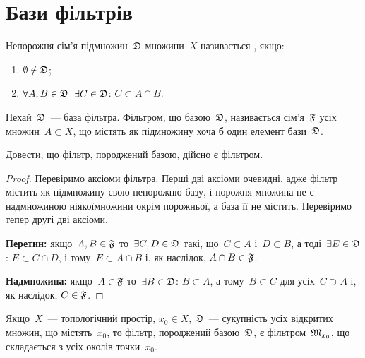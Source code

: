 \section{Бази фільтрів}

\begin{definition}
    Непорожня сім'я підмножин~$\frak D$ множини~$X$ називається , якщо:
    \begin{enumerate}
        \item $\emptyset \notin \frak D$;
        \item $\forall A, B \in \frak D$~$\exists C \in \frak D$: $C \subset A \cap B$.
    \end{enumerate}
\end{definition}

\begin{definition}
    Нехай~$\frak D$~--- база фільтра. Фільтром, що  базою~$\frak D$, називається сім'я~$\frak F$ усіх множин~$A \subset X$, що містять як підмножину хоча б один елемент бази~$\frak D$.
\end{definition}

\begin{exercise}
    Довести, що фільтр, породжений базою, дійсно є фільтром.
\end{exercise}
\begin{proof}
    Перевіримо аксіоми фільтра. Перші дві аксіоми очевидні, адже фільтр містить як підмножину свою непорожню базу, і порожня множина не є надмножиною ніякоїмножини окрім порожньої, а база її не містить. Перевіримо тепер другі дві аксіоми. 
    
    \textbf{Перетин:} якщо~$A, B \in \frak F$ то~$\exists C, D \in \frak D$ такі, що~$C \subset A$ і~$D \subset B$, а тоді~$\exists E \in \frak D$: $E \subset C \cap D$, і тому~$E \subset A \cap B$ і, як наслідок, $A \cap B \in \frak F$. 
    
    \textbf{Надмножина:} якщо~$A \in \frak F$ то~$\exists B \in \frak D$: $B \subset A$, а тому~$B 
    \subset C$ для усіх~$C \supset A$ і, як наслідок, $C \in \frak F$.
\end{proof}

\begin{example}
    Якщо~$X$~--- топологічний простір, $x_0 \in X$, $\frak D$~--- сукупність усіх відкритих множин, що містять~$x_0$, то фільтр, породжений базою~$\frak D$, є фільтром~$\frak M_{x_0}$, що складається з усіх околів точки~$x_0$.
\end{example}

